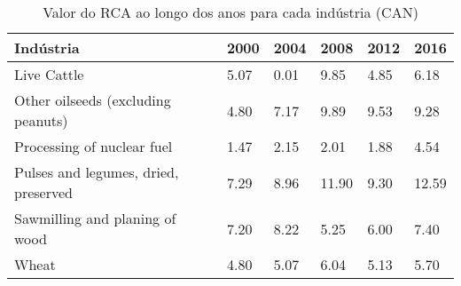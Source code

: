 \begin{table}
\centering
\caption{Valor do RCA ao longo dos anos para cada indústria (CAN)}
\label{tab:ex3-tempo-CAN}
\begin{tabular}{p{6cm}p{1.5cm}p{1.5cm}p{1.5cm}p{1.5cm}p{1.5cm}}
\toprule
                           Indústria & 2000 & 2004 &  2008 & 2012 &  2016 \\
\midrule
                         Live Cattle & 5.07 & 0.01 &  9.85 & 4.85 &  6.18 \\
  Other oilseeds (excluding peanuts) & 4.80 & 7.17 &  9.89 & 9.53 &  9.28 \\
          Processing of nuclear fuel & 1.47 & 2.15 &  2.01 & 1.88 &  4.54 \\
Pulses and legumes, dried, preserved & 7.29 & 8.96 & 11.90 & 9.30 & 12.59 \\
      Sawmilling and planing of wood & 7.20 & 8.22 &  5.25 & 6.00 &  7.40 \\
                               Wheat & 4.80 & 5.07 &  6.04 & 5.13 &  5.70 \\
\bottomrule
\end{tabular}
\end{table}
